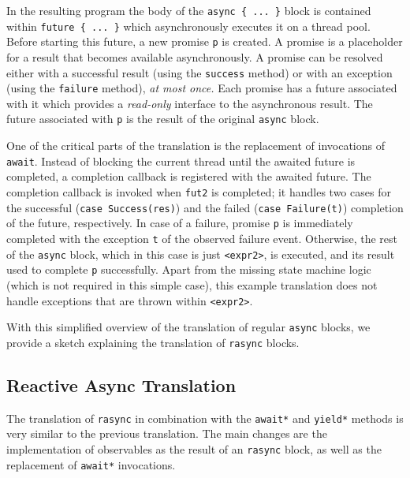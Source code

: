 \documentclass{acm_proc_article-sp}
\begin{document}
In the resulting program the body of the \verb|async { ... }| block is
contained within \verb|future { ... }| which asynchronously executes it on a
thread pool. Before starting this future, a new promise \verb|p| is created. A
promise is a placeholder for a result that becomes available asynchronously. A
promise can be resolved either with a successful result (using the
\verb|success| method) or with an exception (using the \verb|failure| method),
{\em at most once.} Each promise has a future associated with it which
provides a {\em read-only} interface to the asynchronous result. The future
associated with \verb|p| is the result of the original \verb|async| block.

One of the critical parts of the translation is the replacement of invocations
of \verb|await|. Instead of blocking the current thread until the awaited
future is completed, a completion callback is registered with the awaited
future. The completion callback is invoked when \verb|fut2| is completed; it
handles two cases for the successful (\verb|case Success(res)|) and the failed
(\verb|case Failure(t)|) completion of the future, respectively. In case of a
failure, promise \verb|p| is immediately completed with the exception \verb|t|
of the observed failure event. Otherwise, the rest of the \verb|async| block,
which in this case is just \verb|<expr2>|, is executed, and its result used to
complete \verb|p| successfully. Apart from the missing state machine logic
(which is not required in this simple case), this example translation does not
handle exceptions that are thrown within \verb|<expr2>|.

With this simplified overview of the translation of regular \verb|async|
blocks, we provide a sketch explaining the translation of \verb|rasync|
blocks.

\subsection{Reactive Async Translation}\label{sec:rasync-translation}

The translation of \verb|rasync| in combination with the \verb|await*| and
\verb|yield*| methods is very similar to the previous translation. The main
changes are the implementation of observables as the result of an
\verb|rasync| block, as well as the replacement of \verb|await*| invocations.
\end{document}
